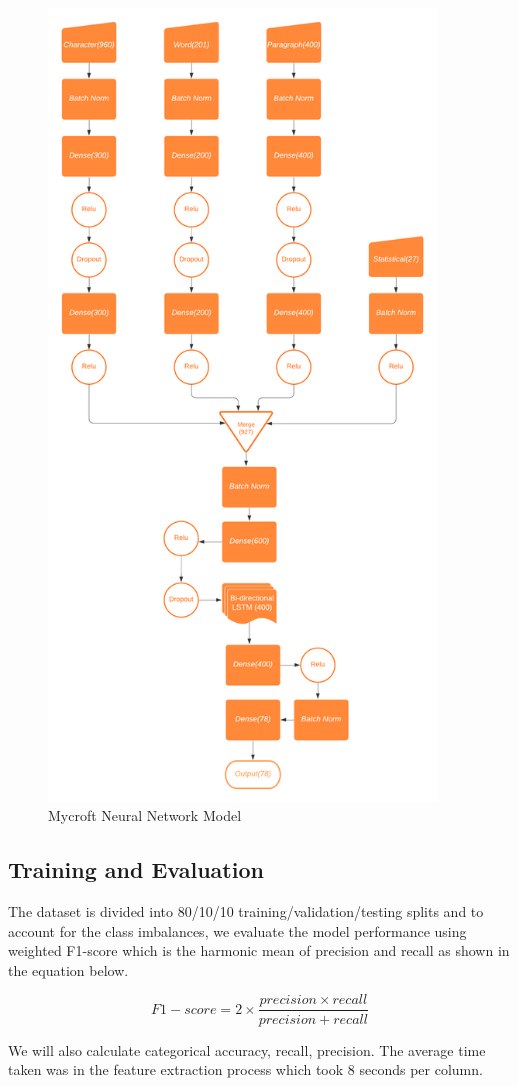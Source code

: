 \documentclass[12pt, a4paper]{report}
\theoremstyle{definition}
\numberwithin{equation}{chapter}
\numberwithin{figure}{chapter}
\numberwithin{table}{chapter}
\begin{document}
\begin{spacing}{1.5}
\begin{figure}[h]
    \centering
    \includegraphics[height=21cm]{./Pics/nnmodel1.png} 
    \caption{Mycroft Neural Network Model}
    \label{fig:nnmodel}
\end{figure}

\subsection*{Training and Evaluation}

The dataset is divided into 80/10/10 training/validation/testing splits and to account for the class imbalances, we evaluate the model performance using weighted F1-score which is the harmonic mean of precision and recall as shown in the equation below.

\begin{equation}
F1-score = 2 × \frac{precision × recall}{precision + recall}
\end{equation}

We will also calculate categorical accuracy, recall, precision. The average time taken was in the feature extraction process which took 8 seconds per column.

\end{spacing}
\end{document}
